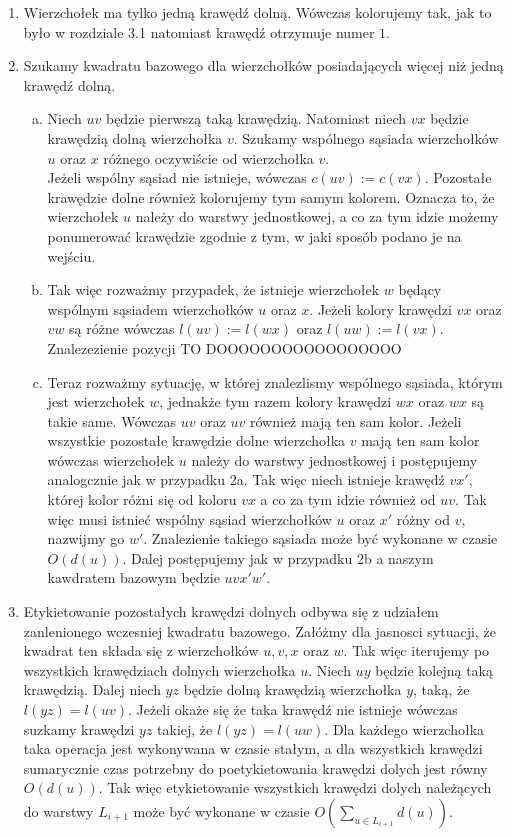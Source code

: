 \documentclass[12pt,a4paper,titlepage]{article}
\begin{document}
\begin{enumerate}
\item Wierzchołek ma tylko jedną krawędź dolną. Wówczas kolorujemy tak, jak to było w rozdziale 3.1 natomiast krawędź otrzymuje numer $1$. 
\item Szukamy kwadratu bazowego dla wierzchołków posiadających więcej niż jedną krawędź dolną. 
\begin{enumerate}[a)]
\item
Niech $uv$ będzie pierwszą taką krawędzią. Natomiast niech $vx$ będzie krawędzią dolną wierzchołka $v$. Szukamy wspólnego sąsiada wierzchołków $u$ oraz $x$ różnego oczywiście od wierzchołka $v$. \\
Jeżeli wspólny sąsiad nie istnieje, wówczas $c(uv):=c(vx)$. Pozostałe krawędzie dolne również kolorujemy tym samym kolorem. Oznacza to, że wierzchołek $u$ należy do warstwy jednostkowej, a co za tym idzie możemy ponumerować krawędzie zgodnie z tym, w jaki sposób podano je na wejściu.\\
\item Tak więc rozważmy przypadek, że istnieje wierzchołek $w$ będący wspólnym sąsiadem wierzchołków $u$ oraz $x$. Jeżeli kolory krawędzi $vx$ oraz $vw$ są różne wówczas $l(uv):=l(wx)$ oraz $l(uw):=l(vx)$. Znalezezienie pozycji TO DOOOOOOOOOOOOOOOOO\\
\item
Teraz rozważmy sytuację, w której znalezlismy wspólnego sąsiada, którym jest wierzchołek $w$, jednakże tym razem kolory krawędzi $wx$ oraz $wx$ są takie same. Wówczas $uv$ oraz $uv$ również mają ten sam kolor. Jeżeli wszystkie pozostałe krawędzie dolne wierzchołka $v$ mają ten sam kolor wówczas wierzchołek $u$ należy do warstwy jednostkowej i postępujemy analogcznie jak w przypadku 2a. Tak więc niech istnieje krawędź $vx'$, której kolor różni się od koloru $vx$ a co za tym idzie również od $uv$. Tak więc musi istnieć wspólny sąsiad wierzchołków $u$ oraz $x'$ różny od $v$, nazwijmy go $w'$. Znalezienie takiego sąsiada może być wykonane w czasie $O(d(u))$. Dalej postępujemy jak w przypadku 2b a naszym kawdratem bazowym będzie $uvx'w'$.
\end{enumerate} 
\item
Etykietowanie pozostałych krawędzi dolnych odbywa się z udziałem zanlenionego wczesniej kwadratu bazowego. Załóżmy dla jasnosci sytuacji, że kwadrat ten składa się z wierzchołków $u,v,x$ oraz $w$. Tak więc iterujemy po wszystkich krawędziach dolnych wierzchołka $u$. Niech $uy$ będzie kolejną taką krawędzią. Dalej niech $yz$ będzie dolną krawędzią wierzchołka $y$, taką, że $l(yz)=l(uv)$. Jeżeli okaże się że taka krawędź nie istnieje wówczas suzkamy krawędzi $yz$ takiej, że $l(yz)=l(uw)$. Dla każdego wierzchołka taka operacja jest wykonywana w czasie stałym, a dla wszystkich krawędzi sumarycznie czas potrzebny do poetykietowania krawędzi dolych jest równy $O(d(u))$. Tak więc etykietowanie wszystkich krawędzi dolych należących do warstwy $L_{i+1}$ może być wykonane w czasie $O(\sum_{u \in L_{i+1}}d(u))$.\\

\end{enumerate}
\end{document}
